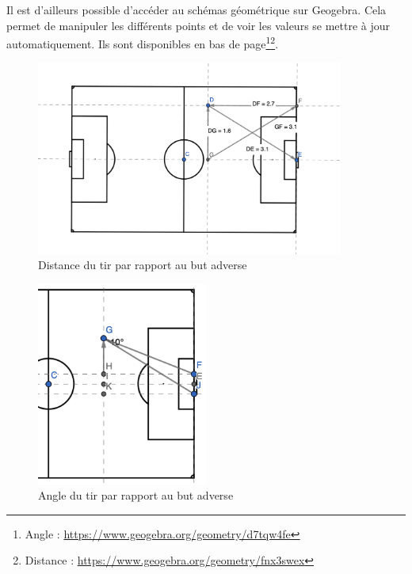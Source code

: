 \documentclass[12pt]{article}
\begin{document}
Il est d'ailleurs possible d'accéder au schémas géométrique sur Geogebra.
Cela permet de manipuler les différents points et de voir les valeurs se mettre à jour automatiquement.
Ils sont disponibles en bas de page\footnote{Angle : \url{https://www.geogebra.org/geometry/d7tqw4fe}}\footnote{Distance : \url{https://www.geogebra.org/geometry/fnx3swex}}.

\begin{figure}[htp]
    \centering
    \includegraphics[width=0.9\textwidth]{img/schema_calcul_distance.png}
    \caption{Distance du tir par rapport au but adverse}
    \label{fig:distance_tir}
\end{figure}
\begin{figure}[htp]
    \centering
    \includegraphics[width=0.5\textwidth]{img/schema_calcul_angle.png}
    \caption{Angle du tir par rapport au but adverse}
    \label{fig:angle_tir}
\end{figure}
\end{document}
